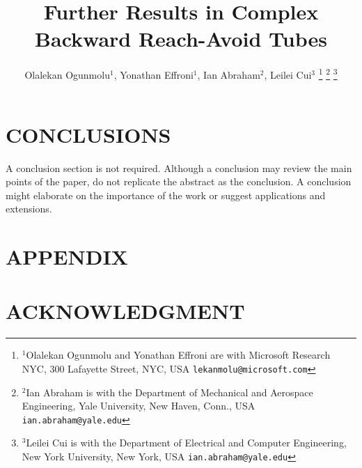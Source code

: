 \documentclass[letterpaper, 10 pt, conference]{ieeeconf}  %
\title{\LARGE \bf
Further Results in Complex Backward Reach-Avoid Tubes}
\author{Olalekan Ogunmolu$^{1}$, Yonathan Effroni$^{1}$, Ian Abraham$^{2}$, Leilei Cui$^{3}$
\thanks{$^{1}$Olalekan Ogunmolu and Yonathan Effroni are with Microsoft Research NYC,
        300 Lafayette Street, NYC, USA
        {\tt\small lekanmolu@microsoft.com}}%
\thanks{$^{2}$Ian Abraham is with the Department of Mechanical and Aerospace Engineering, Yale University,
        New Haven, Conn., USA
        {\tt\small ian.abraham@yale.edu}}%
\thanks{$^{3}$Leilei Cui is with the Department of Electrical and Computer Engineering, New York University,
    New York, USA
    {\tt\small ian.abraham@yale.edu}}%
}
\numberwithin{equation}{section}
\begin{document}
\maketitle
\thispagestyle{empty}
\pagestyle{empty}







\section{CONCLUSIONS}

A conclusion section is not required. Although a conclusion may review the main points of the paper, do not replicate the abstract as the conclusion. A conclusion might elaborate on the importance of the work or suggest applications and extensions. 

\addtolength{\textheight}{-12cm}   %







\section*{APPENDIX}

\section*{ACKNOWLEDGMENT}



	
\end{document}

